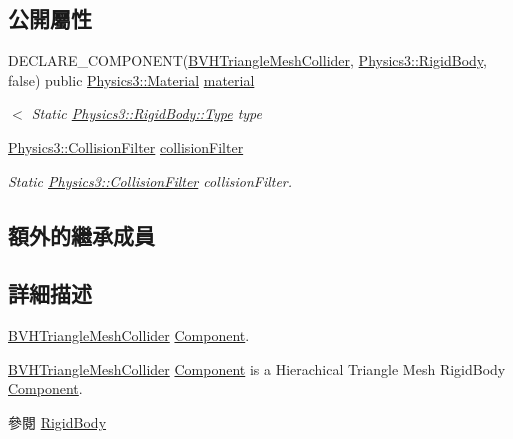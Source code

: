\subsection*{公開屬性}
\begin{DoxyCompactItemize}
\item 
D\+E\+C\+L\+A\+R\+E\+\_\+\+C\+O\+M\+P\+O\+N\+E\+NT(\hyperlink{class_magnum_1_1_b_v_h_triangle_mesh_collider}{B\+V\+H\+Triangle\+Mesh\+Collider}, \hyperlink{class_magnum_1_1_physics3_1_1_rigid_body}{Physics3\+::\+Rigid\+Body}, false) public \hyperlink{class_magnum_1_1_physics3_1_1_material}{Physics3\+::\+Material} \hyperlink{class_magnum_1_1_b_v_h_triangle_mesh_collider_a9fb1ae5c2eb00184fd1601ee6203d987}{material}
\begin{DoxyCompactList}\small\item\em $<$ Static \hyperlink{class_magnum_1_1_physics3_1_1_rigid_body_a429aa4fb7256b083334c86cdcd0d6b31}{Physics3\+::\+Rigid\+Body\+::\+Type} type \end{DoxyCompactList}\item 
\hyperlink{class_magnum_1_1_physics3_1_1_collision_filter}{Physics3\+::\+Collision\+Filter} \hyperlink{class_magnum_1_1_b_v_h_triangle_mesh_collider_a3b3c70ccd2b5c8ed5842a9a9194f872a}{collision\+Filter}\hypertarget{class_magnum_1_1_b_v_h_triangle_mesh_collider_a3b3c70ccd2b5c8ed5842a9a9194f872a}{}\label{class_magnum_1_1_b_v_h_triangle_mesh_collider_a3b3c70ccd2b5c8ed5842a9a9194f872a}

\begin{DoxyCompactList}\small\item\em Static \hyperlink{class_magnum_1_1_physics3_1_1_collision_filter}{Physics3\+::\+Collision\+Filter} collision\+Filter. \end{DoxyCompactList}\end{DoxyCompactItemize}
\subsection*{額外的繼承成員}


\subsection{詳細描述}
\hyperlink{class_magnum_1_1_b_v_h_triangle_mesh_collider}{B\+V\+H\+Triangle\+Mesh\+Collider} \hyperlink{class_magnum_1_1_component}{Component}. 

\hyperlink{class_magnum_1_1_b_v_h_triangle_mesh_collider}{B\+V\+H\+Triangle\+Mesh\+Collider} \hyperlink{class_magnum_1_1_component}{Component} is a Hierachical Triangle Mesh Rigid\+Body \hyperlink{class_magnum_1_1_component}{Component}. \begin{DoxySeeAlso}{參閱}
\hyperlink{class_magnum_1_1_physics3_1_1_rigid_body_a2327744d90c049296ea0d63b3e64d335}{Rigid\+Body} 
\end{DoxySeeAlso}


